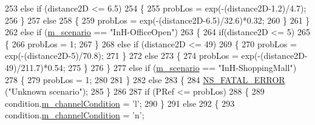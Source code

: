 \begin{DoxyCode}
253                                 \textcolor{keywordflow}{else} \textcolor{keywordflow}{if} (distance2D <= 6.5)
254                                 \{
255                                         probLos = exp(-(distance2D-1.2)/4.7);
256                                 \}
257                                 \textcolor{keywordflow}{else}
258                                 \{
259                                         probLos = exp(-(distance2D-6.5)/32.6)*0.32;
260                                 \}
261                         \}
262                         \textcolor{keywordflow}{else} \textcolor{keywordflow}{if} (\hyperlink{classMmWave3gppPropagationLossModel_a3ba2b9e45f4d02e49620faf03f97e898}{m\_scenario} == \textcolor{stringliteral}{"InH-OfficeOpen"})
263                         \{
264                                 \textcolor{keywordflow}{if}(distance2D <= 5)
265                                 \{
266                                         probLos = 1;
267                                 \}
268                                 \textcolor{keywordflow}{else} \textcolor{keywordflow}{if} (distance2D <= 49)
269                                 \{
270                                         probLos = exp(-(distance2D-5)/70.8);
271                                 \}
272                                 \textcolor{keywordflow}{else}
273                                 \{
274                                         probLos = exp(-(distance2D-49)/211.7)*0.54;
275                                 \}
276                         \}
277                         \textcolor{keywordflow}{else} \textcolor{keywordflow}{if} (\hyperlink{classMmWave3gppPropagationLossModel_a3ba2b9e45f4d02e49620faf03f97e898}{m\_scenario} == \textcolor{stringliteral}{"InH-ShoppingMall"})
278                         \{
279                                 probLos = 1;
280 
281                         \}
282                         \textcolor{keywordflow}{else}
283                         \{
284                                 \hyperlink{group__fatal_ga5131d5e3f75d7d4cbfd706ac456fdc85}{NS\_FATAL\_ERROR} (\textcolor{stringliteral}{"Unknown scenario"});
285                         \}
286 
287                         \textcolor{keywordflow}{if} (PRef <= probLos)
288                         \{
289                                 condition.\hyperlink{structchannelCondition_a1fbbec1a89c5da0961efaca304ade4d1}{m\_channelCondition} = \textcolor{charliteral}{'l'};
290                         \}
291                         \textcolor{keywordflow}{else}
292                         \{
293                                 condition.\hyperlink{structchannelCondition_a1fbbec1a89c5da0961efaca304ade4d1}{m\_channelCondition} = \textcolor{charliteral}{'n'};

\end{DoxyCode}
